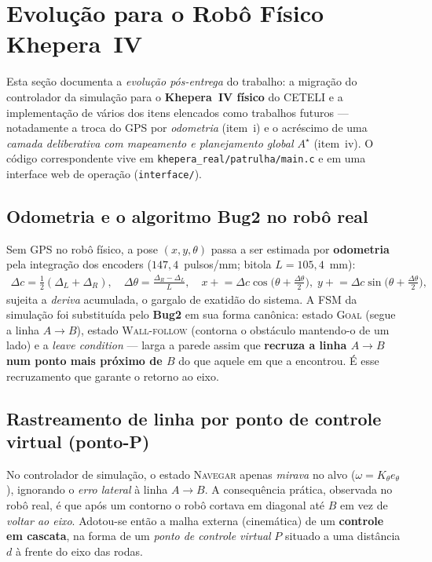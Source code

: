 \documentclass[11pt,a4paper]{article}
\begin{document}
\section{Evolução para o Robô Físico Khepera~IV}\label{sec:real}
Esta seção documenta a \emph{evolução pós-entrega} do trabalho: a migração do controlador da simulação para o \textbf{Khepera~IV físico} do CETELI e a implementação de vários dos itens elencados como trabalhos futuros --- notadamente a troca do GPS por \emph{odometria} (item~i) e o acréscimo de uma \emph{camada deliberativa com mapeamento e planejamento global $A^\star$} (item~iv). O código correspondente vive em \texttt{khepera\_real/patrulha/main.c} e em uma interface web de operação (\texttt{interface/}).

\subsection{Odometria e o algoritmo Bug2 no robô real}
Sem GPS no robô físico, a pose $(x,y,\theta)$ passa a ser estimada por \textbf{odometria} pela integração dos encoders ($147{,}4$~pulsos/mm; bitola $L=105{,}4$~mm):
\begin{align}
  \Delta c = \tfrac12(\Delta_L+\Delta_R), \quad
  \Delta\theta = \frac{\Delta_R-\Delta_L}{L}, \quad
  x \mathrel{+}= \Delta c\cos\!\big(\theta+\tfrac{\Delta\theta}{2}\big),\;
  y \mathrel{+}= \Delta c\sin\!\big(\theta+\tfrac{\Delta\theta}{2}\big),
\end{align}
sujeita a \emph{deriva} acumulada, o gargalo de exatidão do sistema. A FSM da simulação foi substituída pelo \textbf{Bug2} \cite{lumelsky1987} em sua forma canônica: estado \textsc{Goal} (segue a linha $A\!\to\!B$), estado \textsc{Wall-follow} (contorna o obstáculo mantendo-o de um lado) e a \emph{leave condition} --- larga a parede assim que \textbf{recruza a linha $A\!\to\!B$ num ponto mais próximo de $B$} do que aquele em que a encontrou. É esse recruzamento que garante o retorno ao eixo.

\subsection{Rastreamento de linha por ponto de controle virtual (ponto-P)}
No controlador de simulação, o estado \textsc{Navegar} apenas \emph{mirava} no alvo ($\omega=K_\theta e_\theta$), ignorando o \emph{erro lateral} à linha $A\!\to\!B$. A consequência prática, observada no robô real, é que após um contorno o robô cortava em diagonal até $B$ em vez de \emph{voltar ao eixo}. Adotou-se então a malha externa (cinemática) de um \textbf{controle em cascata}, na forma de um \emph{ponto de controle virtual} $P$ situado a uma distância $d$ à frente do eixo das rodas.
\end{document}
